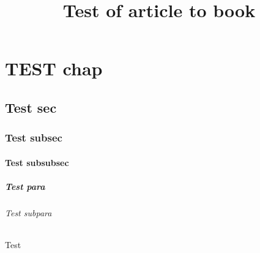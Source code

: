 \documentclass[12pt]{article}
\title{Test of article to book}
\begin{document}
    \tableofcontents
    
    
    
    \chapter{TEST chap}
    \section{Test sec}
    \subsection{Test subsec}
    \subsubsection{Test subsubsec}
    \paragraph{Test para}
    \subparagraph{Test subpara}
    Test
\end{document}
